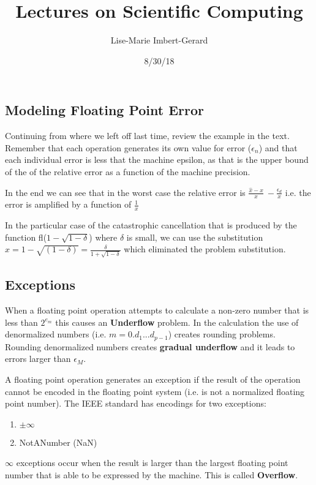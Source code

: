 \documentclass{article}
\title{Lectures on Scientific Computing}
\date{8/30/18}
\author{Lise-Marie Imbert-Gerard}
\newcommand{\n}{\newline}
\begin{document}
	\maketitle
	
	\begin{flushleft}
	\section{Modeling Floating Point Error}
	Continuing from where we left off last time, review the example in the text.  Remember that each operation generates its own value for error ($\epsilon_{n}$) and that each individual error is less that the machine epsilon, as that is the upper bound of the of the relative error as a function of the machine precision. \n
	
	In the end we can see that in the worst case the relative error is $\frac{\hat{x}-x}{x}~-\frac{\epsilon_{d}}{x}$  i.e. the error is amplified by a function of $\frac{1}{x}$ \n
	 
	 In the particular case of the catastrophic cancellation that is produced by the function fl($1-\sqrt{1-\delta}$) where $\delta$ is small, we can use the substitution $x=1-\sqrt{(1-\delta)}=\frac{\delta}{1+\sqrt{1-\delta}}$ which eliminated the problem substitution. \n
	 
	 \subsection{Exceptions}
	 
	 When a floating point operation attempts to calculate a non-zero number that is less than $2^{e_{m}}$ this causes an \textbf{Underflow} problem.  In the calculation the use of denormalized numbers (i.e. $m=0.d_{1}...d_{p-1}$) creates rounding problems.  Rounding denormalized numbers creates \textbf{gradual underflow} and it leads to errors larger than $\epsilon_{M}$.  \n
	 
	 A floating point operation generates an exception if the result of the operation cannot be encoded in the floating point system (i.e. is not a normalized floating point number).  The IEEE standard has encodings for two exceptions:  \n
	 
	 \begin{enumerate}
	 	\item $\pm\infty$ 
	 	\item NotANumber (NaN)\n
	 \end{enumerate}
	 
	 $\infty$ exceptions occur when the result is larger than the largest floating point number that is able to be expressed by the machine.  This is called \textbf{Overflow}.  \n
	 

\end{flushleft}
\end{document}
